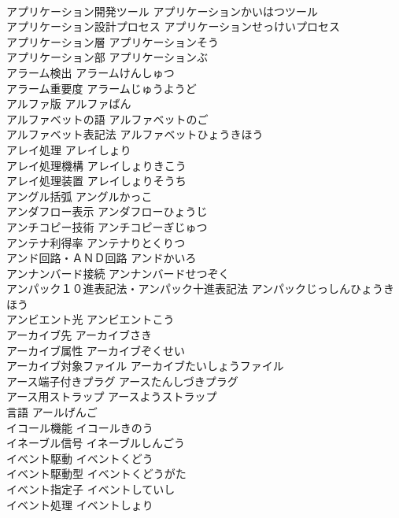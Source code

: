 \documentclass[8pt]{extreport}
\begin{document}
\begin{CJK}{UTF8}{min}
\\	アプリケーション開発ツール	アプリケーションかいはつツール	
\\	アプリケーション設計プロセス	アプリケーションせっけいプロセス	
\\	アプリケーション層	アプリケーションそう	
\\	アプリケーション部	アプリケーションぶ	
\\	アラーム検出	アラームけんしゅつ	
\\	アラーム重要度	アラームじゅうようど	
\\	アルファ版	アルファばん	
\\	アルファベットの語	アルファベットのご	
\\	アルファベット表記法	アルファベットひょうきほう	
\\	アレイ処理	アレイしょり	
\\	アレイ処理機構	アレイしょりきこう	
\\	アレイ処理装置	アレイしょりそうち	
\\	アングル括弧	アングルかっこ	
\\	アンダフロー表示	アンダフローひょうじ	
\\	アンチコピー技術	アンチコピーぎじゅつ	
\\	アンテナ利得率	アンテナりとくりつ	
\\	アンド回路・ＡＮＤ回路	アンドかいろ	
\\	アンナンバード接続	アンナンバードせつぞく	
\\	アンパック１０進表記法・アンパック十進表記法	アンパックじっしんひょうきほう	
\\	アンビエント光	アンビエントこう	
\\	アーカイブ先	アーカイブさき	
\\	アーカイブ属性	アーカイブぞくせい	
\\	アーカイブ対象ファイル	アーカイブたいしょうファイル	
\\	アース端子付きプラグ	アースたんしづきプラグ	
\\	アース用ストラップ	アースようストラップ	
\\	言語	アールげんご	
\\	イコール機能	イコールきのう	
\\	イネーブル信号	イネーブルしんごう	
\\	イベント駆動	イベントくどう	
\\	イベント駆動型	イベントくどうがた	
\\	イベント指定子	イベントしていし	
\\	イベント処理	イベントしょり	

\end{CJK}
\end{document}
